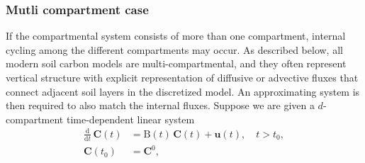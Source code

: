 \documentclass[11pt,a4paper]{article}
\renewcommand{\vec}[1]{\mathbf{#1}}
\newcommand{\tens}[1]{\mathrm{#1}}
\newcommand{\deriv}[1]{\frac{\mathrm{d}}{\mathrm{d}#1}}
\begin{document}
    \subsubsection*{Mutli compartment case}
        If the compartmental system consists of more than one compartment, internal cycling among the different compartments may occur. As described below, all modern soil carbon models are multi-compartmental, and they often represent vertical structure with explicit representation of diffusive or advective fluxes that connect adjacent soil layers in the discretized model.
        An approximating system is then required to also match the internal fluxes.
        Suppose we are given a $d$-compartment time-dependent linear system
        \begin{equation}\label{eqn:CS_multi_dim}
            \begin{aligned}
                \deriv{t}\,\vec{C}(t) &= \tens{B}(t)\,\vec{C}(t) + \vec{u}(t),\quad t>t_0,\\
                \vec{C}(t_0) &= \vec{C}^0,
            \end{aligned}
        \end{equation}
\end{document}
